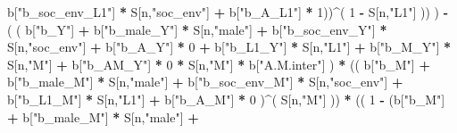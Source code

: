 \documentclass[
]{book}
\newenvironment{Shaded}{\begin{snugshade}}{\end{snugshade}}
\newcommand{\DecValTok}[1]{\textcolor[rgb]{0.00,0.00,0.81}{#1}}
\newcommand{\NormalTok}[1]{#1}
\newcommand{\SpecialCharTok}[1]{\textcolor[rgb]{0.81,0.36,0.00}{\textbf{#1}}}
\newcommand{\StringTok}[1]{\textcolor[rgb]{0.31,0.60,0.02}{#1}}
\begin{document}
\begin{Shaded}
\begin{Highlighting}[]
\NormalTok{                                   b[}\StringTok{"b\_soc\_env\_L1"}\NormalTok{] }\SpecialCharTok{*}\NormalTok{ S[n,}\StringTok{"soc\_env"}\NormalTok{] }\SpecialCharTok{+}
\NormalTok{                                   b[}\StringTok{"b\_A\_L1"}\NormalTok{] }\SpecialCharTok{*} \DecValTok{1}\NormalTok{))}\SpecialCharTok{\^{}}\NormalTok{( }\DecValTok{1} \SpecialCharTok{{-}}\NormalTok{ S[n,}\StringTok{"L1"}\NormalTok{] )) ) }\SpecialCharTok{{-}} 
\NormalTok{                    ( ( b[}\StringTok{"b\_Y"}\NormalTok{] }\SpecialCharTok{+} 
\NormalTok{                          b[}\StringTok{"b\_male\_Y"}\NormalTok{] }\SpecialCharTok{*}\NormalTok{ S[n,}\StringTok{"male"}\NormalTok{] }\SpecialCharTok{+} 
\NormalTok{                          b[}\StringTok{"b\_soc\_env\_Y"}\NormalTok{] }\SpecialCharTok{*}\NormalTok{ S[n,}\StringTok{"soc\_env"}\NormalTok{] }\SpecialCharTok{+} 
\NormalTok{                          b[}\StringTok{"b\_A\_Y"}\NormalTok{] }\SpecialCharTok{*} \DecValTok{0} \SpecialCharTok{+} 
\NormalTok{                          b[}\StringTok{"b\_L1\_Y"}\NormalTok{] }\SpecialCharTok{*}\NormalTok{ S[n,}\StringTok{"L1"}\NormalTok{] }\SpecialCharTok{+}
\NormalTok{                          b[}\StringTok{"b\_M\_Y"}\NormalTok{] }\SpecialCharTok{*}\NormalTok{ S[n,}\StringTok{"M"}\NormalTok{] }\SpecialCharTok{+}
\NormalTok{                          b[}\StringTok{"b\_AM\_Y"}\NormalTok{] }\SpecialCharTok{*} \DecValTok{0} \SpecialCharTok{*}\NormalTok{ S[n,}\StringTok{"M"}\NormalTok{] }\SpecialCharTok{*}\NormalTok{ b[}\StringTok{"A.M.inter"}\NormalTok{] ) }\SpecialCharTok{*}
\NormalTok{                        (( b[}\StringTok{"b\_M"}\NormalTok{] }\SpecialCharTok{+} 
\NormalTok{                             b[}\StringTok{"b\_male\_M"}\NormalTok{] }\SpecialCharTok{*}\NormalTok{ S[n,}\StringTok{"male"}\NormalTok{] }\SpecialCharTok{+} 
\NormalTok{                             b[}\StringTok{"b\_soc\_env\_M"}\NormalTok{] }\SpecialCharTok{*}\NormalTok{ S[n,}\StringTok{"soc\_env"}\NormalTok{] }\SpecialCharTok{+} 
\NormalTok{                             b[}\StringTok{"b\_L1\_M"}\NormalTok{] }\SpecialCharTok{*}\NormalTok{ S[n,}\StringTok{"L1"}\NormalTok{] }\SpecialCharTok{+}
\NormalTok{                             b[}\StringTok{"b\_A\_M"}\NormalTok{] }\SpecialCharTok{*} \DecValTok{0}\NormalTok{ )}\SpecialCharTok{\^{}}\NormalTok{( S[n,}\StringTok{"M"}\NormalTok{] )) }\SpecialCharTok{*}
\NormalTok{                        (( }\DecValTok{1} \SpecialCharTok{{-}}\NormalTok{ (b[}\StringTok{"b\_M"}\NormalTok{] }\SpecialCharTok{+} 
\NormalTok{                                  b[}\StringTok{"b\_male\_M"}\NormalTok{] }\SpecialCharTok{*}\NormalTok{ S[n,}\StringTok{"male"}\NormalTok{] }\SpecialCharTok{+} 

\end{Highlighting}
\end{Shaded}
\end{document}
